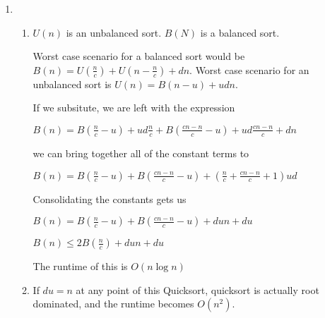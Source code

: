 \documentclass[12pt]{article}
\begin{document}
  


\begin{enumerate}
  \item 
    \begin{enumerate}
      \item 
      $U(n)$ is an unbalanced sort.
      $B(N)$ is a balanced sort.

      Worst case scenario for a balanced sort would be $B(n) = U(\frac{n}{c}) + U(n - \frac{n}{c}) + dn$.
      Worst case scenario for an unbalanced sort is $U(n) = B(n - u) + udn$.

      If we subsitute, we are left with the expression

      $B(n) = B(\frac{n}{c} - u) + ud\frac{n}{c} + B(\frac{cn - n}{c} - u) + ud\frac{cn - n}{c} + dn$

      we can bring together all of the constant terms to

      $B(n) = B(\frac{n}{c} - u) + B(\frac{cn - n}{c} - u) + (\frac{n}{c} + \frac{cn - n}{c} + 1)ud$

      Consolidating the constants gets us 

      $B(n) = B(\frac{n}{c} - u) + B(\frac{cn - n}{c} - u) + dun + du$

      $B(n) \leq 2B(\frac{n}{c}) + dun + du$

      The runtime of this is $O(n\log n)$



      \item
      
      If $du = n$ at any point of this Quicksort, quicksort is actually root dominated, and the runtime becomes $O(n^2)$.

    \end{enumerate}

\end{enumerate}
\end{document}
